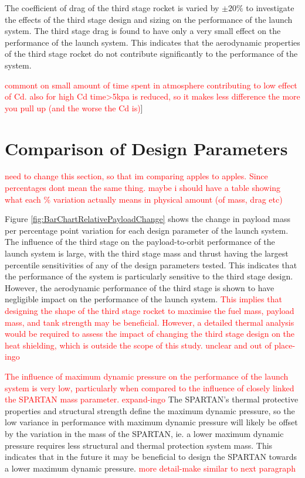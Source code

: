 The coefficient of drag of the third stage rocket is varied by $\pm20\%$ to investigate the effects of the third stage design and sizing on the performance of the launch system. The third stage drag is found to have only a very small effect on the performance of the launch system. This indicates that the aerodynamic properties of the third stage rocket do not contribute significantly to the performance of the system. 

\textcolor{red}{commont on small amount of time spent in atmosphere contributing to low effect of Cd. also for high Cd time>5kpa is reduced, so it makes less difference the more you pull up (and the worse the Cd is)}]

\section{Comparison of Design Parameters}

\textcolor{red}{need to change this section, so that im comparing apples to apples. Since percentages dont mean the same thing. maybe i should have a table showing what each \% variation actually means in physical amount (of mass, drag etc)}

Figure \ref{fig:BarChartRelativePayloadChange} shows the change in payload mass per percentage point variation for each design parameter of the launch system. 
The influence of the third stage on the payload-to-orbit performance of the launch system is large, with the third stage mass and thrust having the largest percentile sensitivities of any of the design parameters tested. This indicates that the performance of the system is particularly sensitive to the third stage design. However, the aerodynamic performance of the third stage is shown to have negligible impact on the performance of the launch system. \textcolor{red}{This implies that designing the shape of the third stage rocket to maximise the fuel mass, payload mass, and tank strength may be beneficial. However, a detailed thermal analysis would be required to assess the impact of changing the third stage design on the heat shielding, which is outside the scope of this study.  unclear and out of place-ingo}


\textcolor{red}{The influence of maximum dynamic pressure on the performance of the launch system is very low, particularly when compared to the influence of closely linked the SPARTAN mass parameter. expand-ingo} The SPARTAN's thermal protective properties and structural strength define the maximum dynamic pressure, so the low variance in performance with maximum dynamic pressure will likely be offset by the variation in the mass of the SPARTAN, ie. a lower maximum dynamic pressure requires less structural and thermal protection system mass. This indicates that in the future it may be beneficial to design the SPARTAN towards a lower maximum dynamic pressure.
\textcolor{red}{more detail-make similar to next paragraph}

